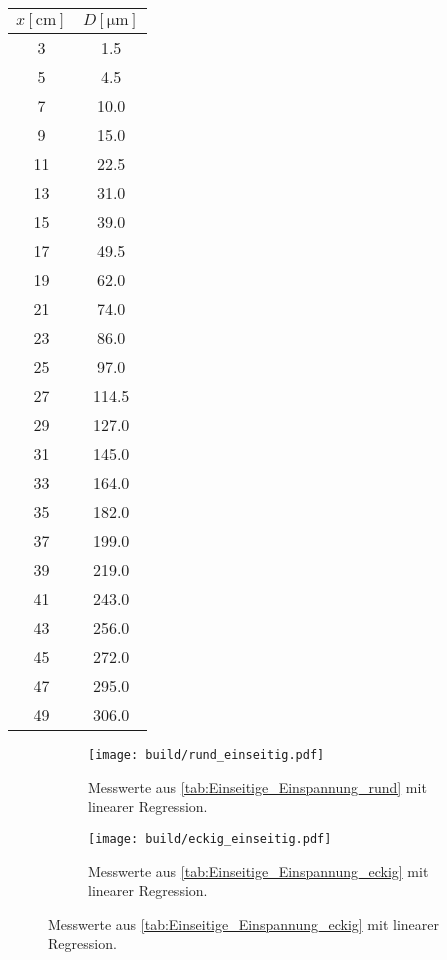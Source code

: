 \begin{table}
\begin{minipage}{0.48\linewidth}
        \label{tab:Einseitige_Einspannung_eckig}
        \begin{tabular}[h!]{|c|c|}
            \toprule
            {$x\left[\unit{\centi\meter}\right]$} & {$D\left[\unit{\micro\meter}\right]$}\\
            \midrule
            3& 1.5\\
            5& 4.5\\
            7& 10.0\\
            9& 15.0\\
            11& 22.5\\
            13& 31.0\\
            15& 39.0\\
            17& 49.5\\
            19& 62.0\\
            21& 74.0\\
            23& 86.0\\
            25& 97.0\\
            27& 114.5\\
            29& 127.0\\
            31& 145.0\\
            33& 164.0\\
            35& 182.0\\
            37& 199.0\\
            39& 219.0\\
            41& 243.0\\
            43& 256.0\\
            45& 272.0\\
            47& 295.0\\
            49& 306.0\\
            \bottomrule
        \end{tabular}
    \end{minipage}
\end{table}
\newpage
\begin{figure}
    \centering
    \begin{subfigure}{0.49\textwidth}
        \centering
        \texttt{[image: build/rund\_einseitig.pdf]}
        \caption{Messwerte aus \autoref{tab:Einseitige_Einspannung_rund} mit linearer Regression.}
        \label{fig:rund_einseitig}
    \end{subfigure}
    \begin{subfigure}{0.49\textwidth}
        \centering
        \texttt{[image: build/eckig\_einseitig.pdf]}
        \caption{Messwerte aus \autoref{tab:Einseitige_Einspannung_eckig} mit linearer Regression.}
        \label{fig:eckig_einseitig}
    \end{subfigure}
    \label{fig:einseitig}
\end{figure}

